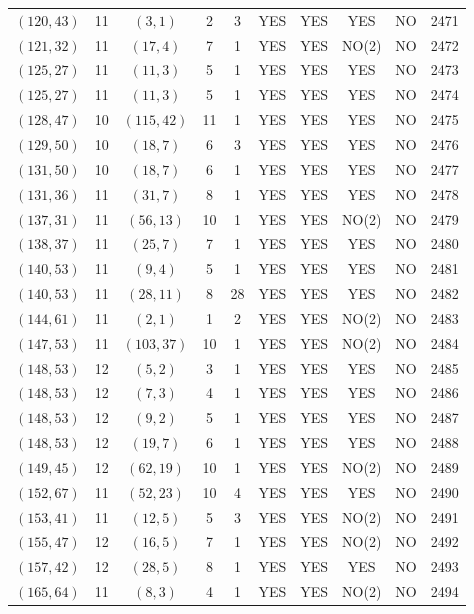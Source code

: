 \begin{longtable}{|c|c|c|c|c|c|c|c|c|c|}
$(120, 43)$ & 11 & $(3, 1)$ & 2 & 3 & YES & YES & YES & NO & 2471\\
$(121, 32)$ & 11 & $(17, 4)$ & 7 & 1 & YES & YES & NO(2) & NO & 2472\\
$(125, 27)$ & 11 & $(11, 3)$ & 5 & 1 & YES & YES & YES & NO & 2473\\
$(125, 27)$ & 11 & $(11, 3)$ & 5 & 1 & YES & YES & YES & NO & 2474\\
$(128, 47)$ & 10 & $(115, 42)$ & 11 & 1 & YES & YES & YES & NO & 2475\\
$(129, 50)$ & 10 & $(18, 7)$ & 6 & 3 & YES & YES & YES & NO & 2476\\
$(131, 50)$ & 10 & $(18, 7)$ & 6 & 1 & YES & YES & YES & NO & 2477\\
$(131, 36)$ & 11 & $(31, 7)$ & 8 & 1 & YES & YES & YES & NO & 2478\\
$(137, 31)$ & 11 & $(56, 13)$ & 10 & 1 & YES & YES & NO(2) & NO & 2479\\
$(138, 37)$ & 11 & $(25, 7)$ & 7 & 1 & YES & YES & YES & NO & 2480\\
$(140, 53)$ & 11 & $(9, 4)$ & 5 & 1 & YES & YES & YES & NO & 2481\\
$(140, 53)$ & 11 & $(28, 11)$ & 8 & 28 & YES & YES & YES & NO & 2482\\
$(144, 61)$ & 11 & $(2, 1)$ & 1 & 2 & YES & YES & NO(2) & NO & 2483\\
$(147, 53)$ & 11 & $(103, 37)$ & 10 & 1 & YES & YES & NO(2) & NO & 2484\\
$(148, 53)$ & 12 & $(5, 2)$ & 3 & 1 & YES & YES & YES & NO & 2485\\
$(148, 53)$ & 12 & $(7, 3)$ & 4 & 1 & YES & YES & YES & NO & 2486\\
$(148, 53)$ & 12 & $(9, 2)$ & 5 & 1 & YES & YES & YES & NO & 2487\\
$(148, 53)$ & 12 & $(19, 7)$ & 6 & 1 & YES & YES & YES & NO & 2488\\
$(149, 45)$ & 12 & $(62, 19)$ & 10 & 1 & YES & YES & NO(2) & NO & 2489\\
$(152, 67)$ & 11 & $(52, 23)$ & 10 & 4 & YES & YES & YES & NO & 2490\\
$(153, 41)$ & 11 & $(12, 5)$ & 5 & 3 & YES & YES & NO(2) & NO & 2491\\
$(155, 47)$ & 12 & $(16, 5)$ & 7 & 1 & YES & YES & NO(2) & NO & 2492\\
$(157, 42)$ & 12 & $(28, 5)$ & 8 & 1 & YES & YES & YES & NO & 2493\\
$(165, 64)$ & 11 & $(8, 3)$ & 4 & 1 & YES & YES & NO(2) & NO & 2494\\

\end{longtable}
